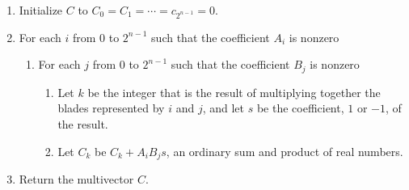 \documentclass{amsproc}
\theoremstyle{definition}
\theoremstyle{remark}
\numberwithin{equation}{section}
\begin{document}
\begin{enumerate}
\item Initialize $C$ to $C_0=C_1=\cdots=c_{2^{n-1}}=0$.
\item For each $i$ from 0 to $2^{n-1}$ such that the coefficient $A_i$
  is nonzero
  \begin{enumerate}
  \item For each $j$ from 0 to $2^{n-1}$ such that the coefficient
    $B_j$ is nonzero
    \begin{enumerate}
      \item Let $k$ be the integer that is the result of multiplying
        together the blades represented by $i$ and $j$, and let $s$ be
        the coefficient, $1$ or $-1$, of the result.
      \item Let $C_k$ be $C_k + A_iB_js$, an ordinary sum and product
        of real numbers.
    \end{enumerate}
  \end{enumerate}
  \item Return the multivector $C$.
\end{enumerate}


\end{document}
